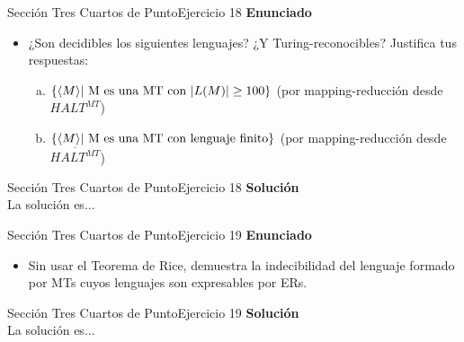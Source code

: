 \documentclass[10pt, envcountsect, presentation, aspectratio=169]{beamer}
\begin{document}

\begin{frame}{Sección Tres Cuartos de Punto}{Ejercicio 18}
    \textbf{Enunciado}
    \begin{itemize}
        \item ¿Son decidibles los siguientes lenguajes? ¿Y Turing-reconocibles? Justifica tus respuestas:
        \begin{enumerate}[a)]
            \item $\{\langle M \rangle \hbox{| M es una MT con } |L(M)| \geq 100\}$ (por mapping-reducción desde $HALT^{MT}$)
            \item $\{\langle M \rangle \hbox{| M es una MT con lenguaje finito}  \}$ (por mapping-reducción desde $\overline{HALT^{MT}}$)
        \end{enumerate}
    \end{itemize}
\end{frame}


\begin{frame}{Sección Tres Cuartos de Punto}{Ejercicio 18}
    \textbf{Solución}\\
    La solución es...
\end{frame}


\begin{frame}{Sección Tres Cuartos de Punto}{Ejercicio 19}
    \textbf{Enunciado}
    \begin{itemize}
        \item Sin usar el Teorema de Rice, demuestra la indecibilidad del lenguaje formado por MTs cuyos lenguajes son expresables por ERs.
    \end{itemize}
\end{frame}


\begin{frame}{Sección Tres Cuartos de Punto}{Ejercicio 19}
    \textbf{Solución}\\
    La solución es...
\end{frame}

\end{document}
